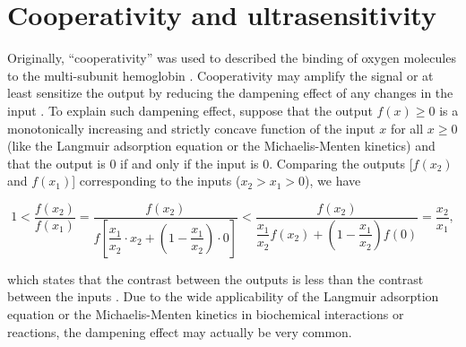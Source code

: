 
\section{Cooperativity and ultrasensitivity}

Originally, ``cooperativity'' was used to described the binding of oxygen molecules to the multi-subunit hemoglobin \cite{KNF, MWC}. Cooperativity may amplify the signal or at least sensitize the output by reducing the dampening effect of any changes in the input \cite{CooperativityQA}. To explain such dampening effect, suppose that the output $f(x) \geq 0$ is a monotonically increasing and strictly concave function of the input $x$ for all $x \geq 0$ (like the Langmuir adsorption equation or the Michaelis-Menten kinetics) and that the output is 0 if and only if the input is 0. Comparing the outputs [$f(x_2)$ and $f(x_1)$] corresponding to the inputs ($x_2 > x_1 > 0$), we have

\begin{equation*}
    1 < \dfrac{f(x_2)}{f(x_1)} = \dfrac{f(x_2)}{f[\dfrac{x_1}{x_2} \cdot x_2 + (1-\dfrac{x_1}{x_2}) \cdot 0]} < \dfrac{f(x_2)}{\dfrac{x_1}{x_2}f(x_2) + (1-\dfrac{x_1}{x_2})f(0)} = \dfrac{x_2}{x_1},
\end{equation*}

\noindent which states that the contrast between the outputs is less than the contrast between the inputs \cite{InhibitorUltrasensitivity}. Due to the wide applicability of the Langmuir adsorption equation or the Michaelis-Menten kinetics in biochemical interactions or reactions, the dampening effect may actually be very common.

